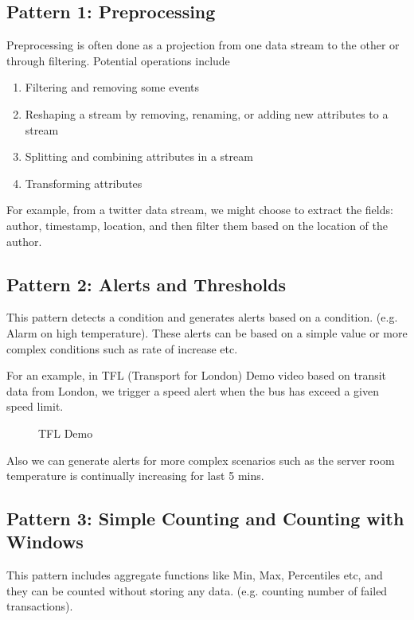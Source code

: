\documentclass{sig-alternate}
\begin{document}
\subsection{Pattern 1: Preprocessing}
Preprocessing is often done as a projection from one data stream to the other or through filtering. Potential operations include
\begin{enumerate}
\item Filtering and removing some events
\item Reshaping a stream by removing, renaming, or adding new attributes to a stream
\item Splitting and combining attributes in a stream 
\item Transforming attributes   
\end{enumerate}

For example, from a twitter data stream, we might choose to extract the fields: author, timestamp, location, and then filter them based on the location of the author. 

\subsection{Pattern 2: Alerts and Thresholds}
This pattern detects a condition and generates alerts based on a condition. (e.g. Alarm on high temperature). These alerts can be based on a simple value or more complex conditions such as rate of increase etc. 

For an example, in TFL (Transport for London) Demo video \cite{tfl} based on transit data from London, we trigger a speed alert  when the bus has exceed a given speed limit. 
 
\begin{figure}[!htbp]
\centering
{}
\caption{TFL Demo}
\label{fig:q1}
\end{figure}

Also we can generate alerts for more complex scenarios such as the server room temperature is continually increasing for last 5 mins. 

\subsection{Pattern 3: Simple Counting and Counting with Windows}

This pattern includes aggregate functions like Min, Max, Percentiles etc, and they can be counted without storing any data. (e.g. counting number of failed transactions). 
\end{document}
